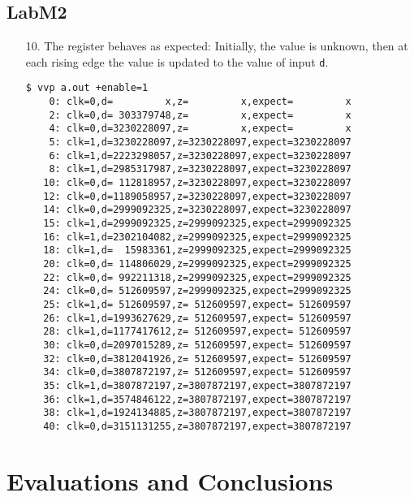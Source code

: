 \documentclass{article}
\begin{document}
\subsection{LabM2}
\begin{enumerate}
\item[10. ] The register behaves as expected: Initially, the value is unknown,
then at each rising edge the value is updated to the value of input \verb$d$.
\begin{verbatim}
$ vvp a.out +enable=1
    0: clk=0,d=         x,z=         x,expect=         x
    2: clk=0,d= 303379748,z=         x,expect=         x
    4: clk=0,d=3230228097,z=         x,expect=         x
    5: clk=1,d=3230228097,z=3230228097,expect=3230228097
    6: clk=1,d=2223298057,z=3230228097,expect=3230228097
    8: clk=1,d=2985317987,z=3230228097,expect=3230228097
   10: clk=0,d= 112818957,z=3230228097,expect=3230228097
   12: clk=0,d=1189058957,z=3230228097,expect=3230228097
   14: clk=0,d=2999092325,z=3230228097,expect=3230228097
   15: clk=1,d=2999092325,z=2999092325,expect=2999092325
   16: clk=1,d=2302104082,z=2999092325,expect=2999092325
   18: clk=1,d=  15983361,z=2999092325,expect=2999092325
   20: clk=0,d= 114806029,z=2999092325,expect=2999092325
   22: clk=0,d= 992211318,z=2999092325,expect=2999092325
   24: clk=0,d= 512609597,z=2999092325,expect=2999092325
   25: clk=1,d= 512609597,z= 512609597,expect= 512609597
   26: clk=1,d=1993627629,z= 512609597,expect= 512609597
   28: clk=1,d=1177417612,z= 512609597,expect= 512609597
   30: clk=0,d=2097015289,z= 512609597,expect= 512609597
   32: clk=0,d=3812041926,z= 512609597,expect= 512609597
   34: clk=0,d=3807872197,z= 512609597,expect= 512609597
   35: clk=1,d=3807872197,z=3807872197,expect=3807872197
   36: clk=1,d=3574846122,z=3807872197,expect=3807872197
   38: clk=1,d=1924134885,z=3807872197,expect=3807872197
   40: clk=0,d=3151131255,z=3807872197,expect=3807872197
\end{verbatim}
\end{enumerate}


\section{Evaluations and Conclusions}

\end{document}

